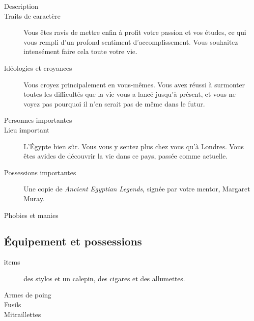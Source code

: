 \documentclass[11pt]{article}
\begin{document}
\begin{twocols}
\begin{description}
\item[{Description}] 

\item[{Traits de caractère}] Vous êtes ravis de mettre enfin à profit votre passion et vos études, ce qui vous rempli d'un profond sentiment d'accomplissement. Vous souhaitez intensément faire cela toute votre vie.
\item[{Idéologies et croyances}] Vous croyez principalement en vous-mêmes. Vous avez réussi à surmonter toutes les difficultés que la vie vous a lancé jusqu'à présent, et vous ne voyez pas pourquoi il n'en serait pas de même dans le futur.
\item[{Personnes importantes}] 

\item[{Lieu important}] L'Égypte bien sûr. Vous vous y sentez plus chez vous qu'à Londres. Vous êtes avides de découvrir la vie dans ce pays, passée comme actuelle.
\item[{Possessions importantes}] Une copie de \emph{Ancient Egyptian Legends}, signée par votre mentor, Margaret Muray.
\item[{Phobies et manies}] 
\end{description}

\subsection{Équipement et possessions}
\label{sec:org0621bf1}

\begin{description}
\item[{items}] des stylos et un calepin, des cigares et des allumettes.
\item[{Armes de poing}] 

\item[{Fusils}] 

\item[{Mitraillettes}] 
\end{description}


\end{twocols}
\pagebreak
\end{document}
